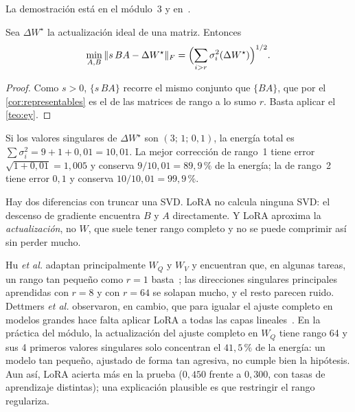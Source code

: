 La demostración está en el módulo~3 y en~\cite{eckart-young}.

\begin{corolario}\label{cor:error-lora}
Sea $\Delta W^{\star}$ la actualización ideal de una matriz. Entonces
\[
\min_{A,B}\,\lVert s\,BA-\Delta W^{\star}\rVert_F=\Bigl(\sum_{i>r}\sigma_i^{2}(\Delta W^{\star})\Bigr)^{1/2}.
\]
\end{corolario}

\begin{proof}
Como $s>0$, $\{s\,BA\}$ recorre el mismo conjunto que $\{BA\}$, que por el \cref{cor:representables} es el de las matrices de rango a lo sumo $r$. Basta aplicar el \cref{teo:ey}.
\end{proof}

\begin{ejemplo}\label{ej:energia}
Si los valores singulares de $\Delta W^{\star}$ son $(3;\,1;\,0{,}1)$, la energía total es $\sum\sigma_i^{2}=9+1+0{,}01=10{,}01$. La mejor corrección de rango~1 tiene error $\sqrt{1+0{,}01}=1{,}005$ y conserva $9/10{,}01=89{,}9\,\%$ de la energía; la de rango~2 tiene error $0{,}1$ y conserva $10/10{,}01=99{,}9\,\%$.
\end{ejemplo}

Hay dos diferencias con truncar una SVD. LoRA no calcula ninguna SVD: el descenso de gradiente encuentra $B$ y $A$ directamente. Y LoRA aproxima la \emph{actualización}, no $W$, que suele tener rango completo y no se puede comprimir así sin perder mucho.

\begin{observacion}
Hu \emph{et al.} adaptan principalmente $W_Q$ y $W_V$ y encuentran que, en algunas tareas, un rango tan pequeño como $r=1$ basta~\cite[§7.1 y~§7.2]{hu-lora}; las direcciones singulares principales aprendidas con $r=8$ y con $r=64$ se solapan mucho, y el resto parecen ruido. Dettmers \emph{et al.} observaron, en cambio, que para igualar el ajuste completo en modelos grandes hace falta aplicar LoRA a todas las capas lineales~\cite[§4]{dettmers}. En la práctica del módulo, la actualización del ajuste completo en $W_Q$ tiene rango 64 y sus 4 primeros valores singulares solo concentran el $41{,}5\,\%$ de la energía: un modelo tan pequeño, ajustado de forma tan agresiva, no cumple bien la hipótesis. Aun así, LoRA acierta más en la prueba ($0{,}450$ frente a $0{,}300$, con tasas de aprendizaje distintas); una explicación plausible es que restringir el rango regulariza.
\end{observacion}

